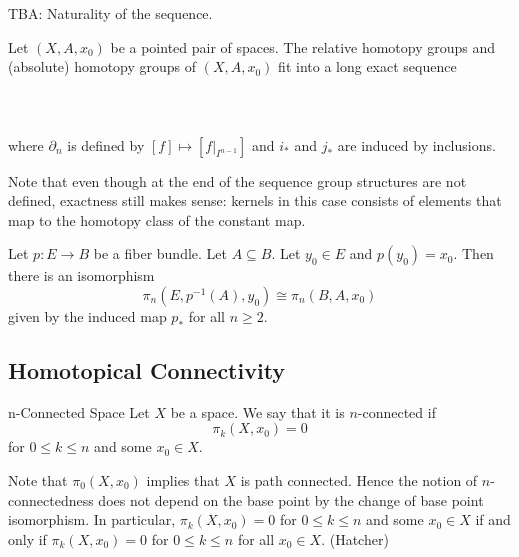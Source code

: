 \documentclass[a4paper]{article}
\begin{document}
TBA: Naturality of the sequence. 

\begin{thm}{}{} Let $(X,A,x_0)$ be a pointed pair of spaces. The relative homotopy groups and (absolute) homotopy groups of $(X,A,x_0)$ fit into a long exact sequence \\~\\
\\~\\
where $\partial_n$ is defined by $[f]\mapsto [f|_{I^{n-1}}]$ and $i_\ast$ and $j_\ast$ are induced by inclusions. 
\end{thm}

Note that even though at the end of the sequence group structures are not defined, exactness still makes sense: kernels in this case consists of elements that map to the homotopy class of the constant map. 

\begin{thm}{}{} Let $p:E\to B$ be a fiber bundle. Let $A\subseteq B$. Let $y_0\in E$ and $p(y_0)=x_0$. Then there is an isomorphism $$\pi_n(E,p^{-1}(A),y_0)\cong\pi_n(B,A,x_0)$$ given by the induced map $p_\ast$ for all $n\geq 2$. 
\end{thm}

\subsection{Homotopical Connectivity}
\begin{defn}{n-Connected Space}{} Let $X$ be a space. We say that it is $n$-connected if $$\pi_k(X,x_0)=0$$ for $0\leq k\leq n$ and some $x_0\in X$. 
\end{defn}

Note that $\pi_0(X,x_0)$ implies that $X$ is path connected. Hence the notion of $n$-connectedness does not depend on the base point by the change of base point isomorphism. In particular, $\pi_k(X,x_0)=0$ for $0\leq k\leq n$ and some $x_0\in X$ if and only if $\pi_k(X,x_0)=0$ for $0\leq k\leq n$ for all $x_0\in X$. (Hatcher)
\end{document}
